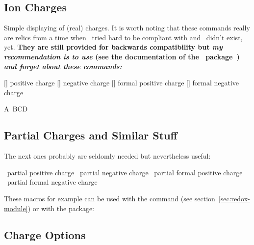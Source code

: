 \documentclass{chemmacros-manual}
\begin{document}
\subsection{Ion Charges}\label{sec:ion-charges}
Simple displaying of (real) charges.  It is worth noting that these commands
really are relics from a time when \chemmacros\ tried hard to be compliant
with  and \chemformula\ didn't exist, yet.  \textbf{They are still
  provided for backwards compatibility but \emph{my recommendation is to use}
   (see the documentation of the \chemformula\
  package~\cite{pkg:chemformula}) \emph{and forget about these commands:}}
\begin{commands}
  []
    positive charge
  []
    negative charge
  []
    formal positive charge
  []
    formal negative charge
\end{commands}
\begin{example}
  A\pch\ B\mch[3] C\fpch[2] D\fmch
\end{example}

\subsection{Partial Charges and Similar Stuff}\label{sec:part-charg-simil}

The next ones probably are seldomly needed but nevertheless useful:
\begin{commands}
   \delp\ partial positive charge
   \delm\ partial negative charge
   \fdelp\ partial formal positive charge
   \fdelm\ partial formal negative charge
\end{commands}

These macros for example can be used with the  command (see
section~\vref{sec:redox-module}) or with the \pkg{chemfig} package:
\begin{example}
   \hspace*{1cm}
\end{example}

\subsection{Charge Options}
\end{document}
